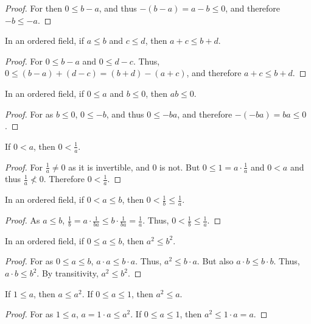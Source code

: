 \documentclass[crop=false,class=book,oneside]{standalone}
\begin{document}
            \begin{proof}
            For then $0 \leq b-a$, and thus $-(b-a)=a-b\leq 0$, and therefore $-b \leq -a$.
            \end{proof}
            \begin{theorem}
            In an ordered field, if $a\leq b$ and $c\leq d$, then $a+c \leq b+d$.
            \end{theorem}
            \begin{proof}
            For $0\leq b-a$ and $0\leq d-c$. Thus, $0\leq (b-a)+(d-c)= (b+d)-(a+c)$, and therefore $a+c \leq b+d$.
            \end{proof}
            \begin{theorem}
            In an ordered field, if $0\leq a$ and $b\leq 0$, then $ab\leq 0$.
            \end{theorem}
            \begin{proof}
            For as $b\leq 0$, $0\leq -b$, and thus $0\leq -ba$, and therefore $-(-ba) = ba \leq 0$.
            \end{proof}
            \begin{theorem}
            If $0< a$, then $0<\frac{1}{a}$.
            \end{theorem}
            \begin{proof}
            For $\frac{1}{a}\ne 0$ as it is invertible, and $0$ is not. But $0\leq1=a\cdot \frac{1}{a}$ and $0<a$ and thus $\frac{1}{a} \not <0$. Therefore $0<\frac{1}{a}$.
            \end{proof}
            \begin{theorem}
            In an ordered field, if $0<a\leq b$, then $0<\frac{1}{b}\leq\frac{1}{a}$.
            \end{theorem}
            \begin{proof}
            As $a\leq b$, $\frac{1}{b}=a\cdot \frac{1}{ba} \leq b\cdot \frac{1}{ba}=\frac{1}{a}$. Thus, $0< \frac{1}{b}\leq \frac{1}{a}$.
            \end{proof}
            \begin{theorem}
            In an ordered field, if $0 \leq a \leq b$, then $a^2 \leq b^2$.
            \end{theorem}
            \begin{proof}
            For as $0\leq a \leq b$, $a\cdot a \leq b\cdot a$. Thus, $a^2 \leq b \cdot a$. But also $a\cdot b \leq b\cdot b$. Thus, $a\cdot b \leq b^2$. By transitivity, $a^2 \leq b^2$.
            \end{proof}
            \begin{corollary}
            If $1\leq a$, then $a \leq a^2$. If $0\leq a \leq 1$, then $a^2 \leq a$.
            \end{corollary}
            \begin{proof}
            For as $1\leq a$, $a=1\cdot a \leq a^2$. If $0\leq a \leq 1$, then $a^2 \leq 1\cdot a = a$.
            \end{proof}
\end{document}
